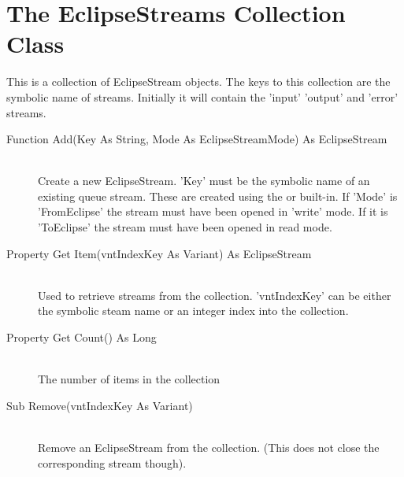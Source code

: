 \section{The EclipseStreams Collection Class}
This is a collection of EclipseStream objects. The keys to this collection
are the symbolic name of {\eclipse} streams. Initially it
will contain the 'input' 'output' and 'error' streams.

\begin{description}
\item[Function Add(Key As String, Mode As EclipseStreamMode) As EclipseStream]\ \\
	Create a new EclipseStream. 'Key' must be the symbolic name of an
	existing {\eclipse} queue stream. These are created using the
	 or
	built-in. If 'Mode' is 'FromEclipse' the {\eclipse} stream must
	have been opened in 'write' mode. If it is 'ToEclipse' the \eclipse
	stream must have been opened in read mode.

\item[Property Get Item(vntIndexKey As Variant) As EclipseStream]\ \\
	Used to retrieve streams from the collection. 'vntIndexKey' can
	be either the symbolic steam name or an integer index into the
	collection.

\item[Property Get Count() As Long]\ \\
	The number of items in the collection

\item[Sub Remove(vntIndexKey As Variant)]\ \\
	Remove an EclipseStream from the collection. (This does not
	close the corresponding {\eclipse} stream though).

\end{description}


